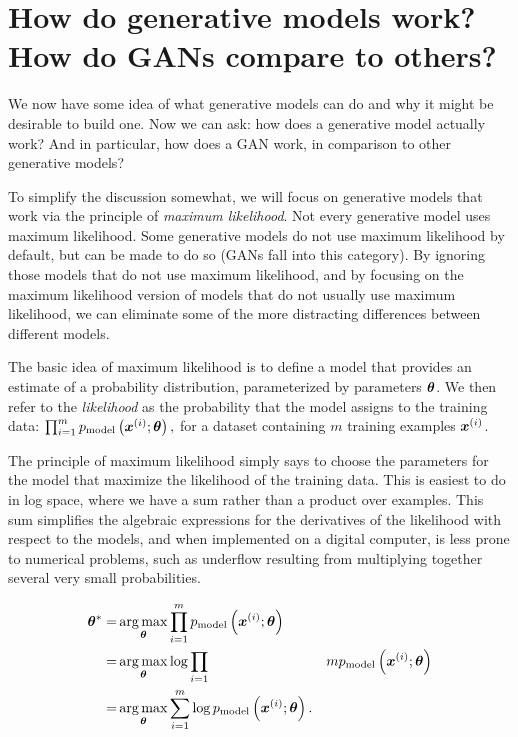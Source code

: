 \section{How do generative models work? How do GANs compare to others?}
\label{sec:tree}

We now have some idea of what generative models can do and why it might be
desirable to build one.
Now we can ask: how does a generative model actually work? And in particular,
how does a GAN work, in comparison to other generative models?

To simplify the discussion somewhat, we will focus on generative models
that work via the principle of {\em maximum likelihood}.
Not every generative model uses maximum likelihood.
Some generative models do not use maximum likelihood by default, but
can be made to do so (GANs fall into this category).
By ignoring those models that do not use maximum likelihood, and
by focusing on the maximum likelihood version of models that do not
usually use maximum likelihood, we can eliminate some of the more 
distracting differences between different models.

The basic idea of maximum likelihood is to define a model that provides
an estimate of a probability distribution, parameterized by parameters
${\bm{\theta}}$.
We then refer to the {\em likelihood} as the probability that the model
assigns to the training data: $\prod_{i=1}^m p_{\rm{model}}\left({\bm{x}}^{(i)}; {\bm{\theta}} \right),$
for a dataset containing $m$ training examples ${\bm{x}}^{(i)}$.

The principle of maximum likelihood simply says to choose the parameters for the model
that maximize the likelihood of the training data.
This is easiest to do in log space, where we have a sum rather than a product
over examples.
This sum simplifies the algebraic expressions for the derivatives of the likelihood
with respect to the models, and when implemented on a digital computer, is less
prone to numerical problems, such as underflow resulting from multiplying together
several very small probabilities.

\begin{align}
{\bm{\theta}}^* =& \operatorname*{arg\,max}_{\bm{\theta}} \prod_{i=1}^m p_{\rm{model}}\left({\bm{x}}^{(i)}; {\bm{\theta}} \right) \\
  =& \operatorname*{arg\,max}_{\bm{\theta}} \log \prod_{i=1}&m p_{\rm{model}}\left({\bm{x}}^{(i)}; {\bm{\theta}} \right) \label{eq:log} \\
          =& \operatorname*{arg\,max}_{\bm{\theta}} \sum_{i=1}^m \log p_{\rm{model}}\left({\bm{x}}^{(i)}; {\bm{\theta}} \right).
\end{align}

